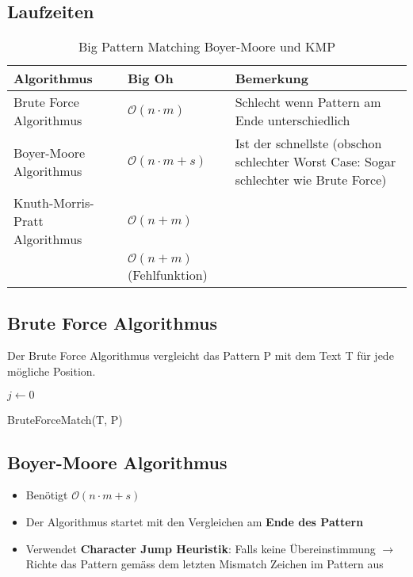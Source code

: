 \subsection{Laufzeiten}
\begin{table}[h]
	\centering
	\begin{tabu} to \linewidth {l l X}
		\toprule
		Algorithmus & Big Oh & Bemerkung \\
		\midrule
		Brute Force Algorithmus & $\mathcal{O}(n \cdot m)$ & Schlecht wenn Pattern am Ende unterschiedlich \\
		Boyer-Moore Algorithmus & $\mathcal{O}(n \cdot m + s)$ & Ist der schnellste (obschon schlechter Worst Case: Sogar schlechter wie Brute Force) \\
		Knuth-Morris-Pratt Algorithmus & $\mathcal{O}(n+m)$ & \\
		& $\mathcal{O}(n+m)$ (Fehlfunktion)\\
		\bottomrule
	\end{tabu}
	\caption{Big Pattern Matching Boyer-Moore und KMP}
\end{table}

\subsection{Brute Force Algorithmus}
Der Brute Force Algorithmus vergleicht das Pattern P mit dem Text T für jede mögliche Position.
\begin{algorithm}[H]
	{
		$j \leftarrow 0$ \\

		 {
		}
	}
\caption{BruteForceMatch(T, P)}
\end{algorithm}


\subsection{Boyer-Moore Algorithmus}
\begin{itemize}
	\item Benötigt $\mathcal{O}(n\cdot m + s)$
	\item Der Algorithmus startet mit den Vergleichen am \textbf{Ende des Pattern}
	\item Verwendet \textbf{Character Jump Heuristik}: Falls keine Übereinstimmung $\rightarrow$ Richte das Pattern gemäss dem letzten Mismatch Zeichen im Pattern aus
\end{itemize}

